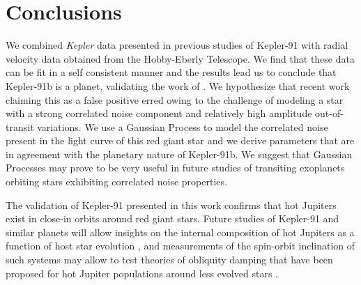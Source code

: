 \documentclass[apjl]{emulateapj}
\begin{document}





\section{Conclusions}
We combined \emph{Kepler} data presented in previous studies of Kepler-91 with radial velocity data obtained from the Hobby-Eberly Telescope. We find that these data can be fit in a self consistent manner and the results lead us to conclude that Kepler-91b is a planet, validating the work of \citet{lillo14}. We hypothesize that recent work claiming this as a false positive erred owing to the challenge of modeling a star with a strong correlated noise component and relatively high amplitude out-of-transit variations. We use a Gaussian Process to model the correlated noise present in the light curve of this red giant star and we derive parameters that are in agreement with the planetary nature of Kepler-91b. We suggest that Gaussian Processes may prove to be very useful in future studies of transiting exoplanets orbiting stars exhibiting correlated noise properties.

The validation of Kepler-91 presented in this work confirms that hot Jupiters exist in close-in orbits around red giant stars. Future studies of Kepler-91 and similar planets will allow insights on the internal composition of hot Jupiters as a function of host star evolution \citep{spiegel12}, and measurements of the spin-orbit inclination of such systems may allow to test theories of obliquity damping that have been proposed for hot Jupiter populations around less evolved stars \citep{winn10}.
\end{document}
